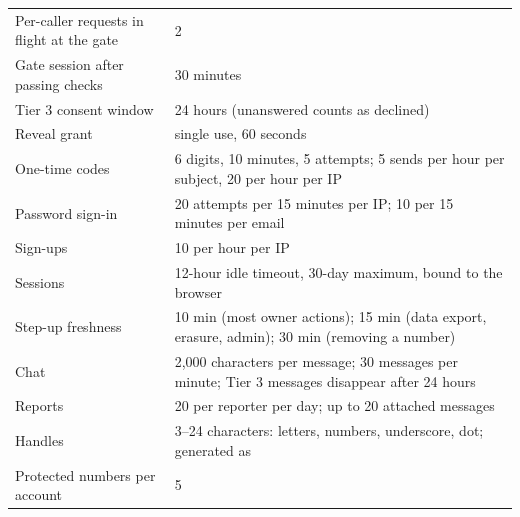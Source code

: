 \begin{tabularx}{\linewidth}{@{}L{6.3cm}Y@{}}
\toprule
Per-caller requests in flight at the gate & 2 \\
Gate session after passing checks & 30 minutes \\
Tier 3 consent window & 24 hours (unanswered counts as declined) \\
Reveal grant & single use, 60 seconds \\
One-time codes & 6 digits, 10 minutes, 5 attempts; 5 sends per hour per subject, 20 per hour per IP \\
Password sign-in & 20 attempts per 15 minutes per IP; 10 per 15 minutes per email \\
Sign-ups & 10 per hour per IP \\
Sessions & 12-hour idle timeout, 30-day maximum, bound to the browser \\
Step-up freshness & 10 min (most owner actions); 15 min (data export, erasure, admin); 30 min (removing a number) \\
Chat & 2,000 characters per message; 30 messages per minute; Tier 3 messages disappear after 24 hours \\
Reports & 20 per reporter per day; up to 20 attached messages \\
Handles & 3--24 characters: letters, numbers, underscore, dot; generated as  \\
Protected numbers per account & 5 \\
\bottomrule
\end{tabularx}
